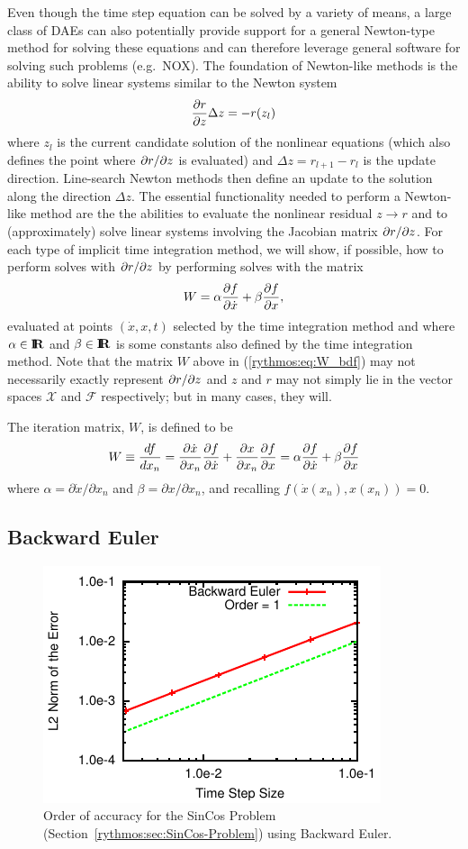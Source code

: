 Even though the time step equation can be solved by a variety of means,
a large class of DAEs can also potentially provide support for a general
Newton-type method for solving these equations and can therefore leverage
general software for solving such problems (e.g.\ NOX). The foundation
of Newton-like methods is the ability to solve linear systems similar
to the Newton system 
\begin{equation}
\displaystyle{\frac{\partial r}{\partial z}}\Delta z=-r(z_{l})
\end{equation}
where $z_{l}$ is the current candidate solution of the nonlinear
equations (which also defines the point where $\partial r / \partial z$ is evaluated)
and $\Delta z=r_{l+1}-r_{l}$ is the update direction. Line-search
Newton methods then define an update to the solution along the direction
$\Delta z$. The essential functionality needed to perform a Newton-like
method are the the abilities to evaluate the nonlinear residual $z{}\rightarrow r$
and to (approximately) solve linear systems involving the Jacobian
matrix $\partial r / \partial z$. For each type of implicit time integration method,
we will show, if possible, how to perform solves with $\partial r / \partial z$
by performing solves with the matrix 
\begin{equation}
W=\alpha\displaystyle{\frac{\partial f}{\partial \dot{x}}}+\beta\displaystyle{\frac{\partial f}{\partial x}},\label{rythmos:eq:W}
\end{equation}
evaluated at points $(\dot{x},x,t)$ selected by the time integration
method and where $\alpha\in\mbox{\textbf{I}}\hspace{-0.6ex}\mbox{\textbf{R}}$ and $\beta\in\mbox{\textbf{I}}\hspace{-0.6ex}\mbox{\textbf{R}}$ is some constants
also defined by the time integration method. Note that the matrix
$W$ above in (\ref{rythmos:eq:W_bdf}) may not necessarily exactly
represent $\partial r / \partial z$ and $z$ and $r$ may not simply lie in the
vector spaces $\mathcal{X}$ and $\mathcal{F}$ respectively; but
in many cases, they will.

The iteration matrix, $W$, is defined to be
\[
W\equiv\frac{df}{dx_{n}}=\frac{\partial\dot{x}}{\partial x_{n}}\displaystyle{\frac{\partial f}{\partial \dot{x}}}+\frac{\partial x}{\partial x_{n}}\displaystyle{\frac{\partial f}{\partial x}}=\alpha\displaystyle{\frac{\partial f}{\partial \dot{x}}}+\beta\displaystyle{\frac{\partial f}{\partial x}}
\]
where $\alpha=\partial\dot{x}/\partial x_{n}$ and $\beta=\partial x/\partial x_{n}$,
and recalling $f\left(\dot{x}(x_{n}),x(x_{n})\right)=0$.


\subsection{Backward Euler}

\begin{figure}[H]
\centering{}\includegraphics[scale=1.5]{figures/BackwardEuler}\caption{Order of accuracy for the SinCos Problem (Section~\ref{rythmos:sec:SinCos-Problem})
using Backward Euler.}
\end{figure}

